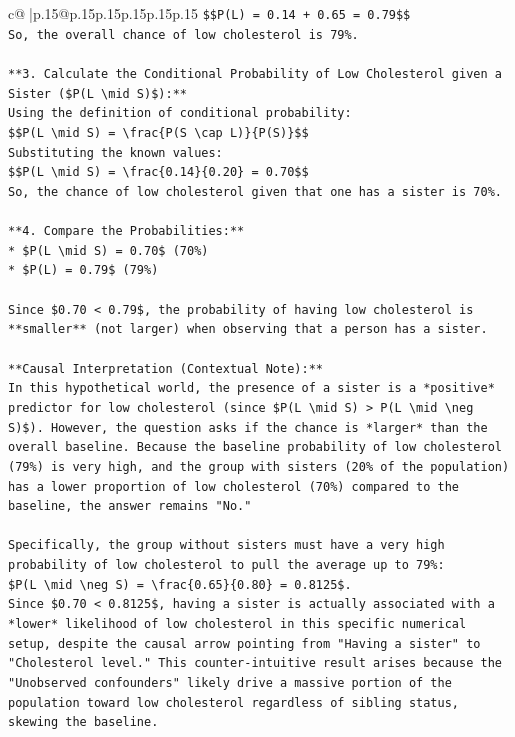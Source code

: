 \documentclass{article}
\begin{document}
{\begin{supertabular}{c@{$\;$}|p{.15\linewidth}@{}p{.15\linewidth}p{.15\linewidth}p{.15\linewidth}p{.15\linewidth}p{.15\linewidth}}
{{{\texttt{\$\$P(L) = 0.14 + 0.65 = 0.79\$\$} \\
\texttt{So, the overall chance of low cholesterol is 79\%.} \\
\\ 
\texttt{**3. Calculate the Conditional Probability of Low Cholesterol given a Sister (\$P(L \textbackslash{}mid S)\$):**} \\
\texttt{Using the definition of conditional probability:} \\
\texttt{\$\$P(L \textbackslash{}mid S) = \textbackslash{}frac\{P(S \textbackslash{}cap L)\}\{P(S)\}\$\$} \\
\texttt{Substituting the known values:} \\
\texttt{\$\$P(L \textbackslash{}mid S) = \textbackslash{}frac\{0.14\}\{0.20\} = 0.70\$\$} \\
\texttt{So, the chance of low cholesterol given that one has a sister is 70\%.} \\
\\ 
\texttt{**4. Compare the Probabilities:**} \\
\texttt{*   \$P(L \textbackslash{}mid S) = 0.70\$ (70\%)} \\
\texttt{*   \$P(L) = 0.79\$ (79\%)} \\
\\ 
\texttt{Since \$0.70 < 0.79\$, the probability of having low cholesterol is **smaller** (not larger) when observing that a person has a sister.} \\
\\ 
\texttt{**Causal Interpretation (Contextual Note):**} \\
\texttt{In this hypothetical world, the presence of a sister is a *positive* predictor for low cholesterol (since \$P(L \textbackslash{}mid S) > P(L \textbackslash{}mid \textbackslash{}neg S)\$). However, the question asks if the chance is *larger* than the overall baseline. Because the baseline probability of low cholesterol (79\%) is very high, and the group with sisters (20\% of the population) has a lower proportion of low cholesterol (70\%) compared to the baseline, the answer remains "No."} \\
\\ 
\texttt{Specifically, the group without sisters must have a very high probability of low cholesterol to pull the average up to 79\%:} \\
\texttt{\$P(L \textbackslash{}mid \textbackslash{}neg S) = \textbackslash{}frac\{0.65\}\{0.80\} = 0.8125\$.} \\
\texttt{Since \$0.70 < 0.8125\$, having a sister is actually associated with a *lower* likelihood of low cholesterol in this specific numerical setup, despite the causal arrow pointing from "Having a sister" to "Cholesterol level." This counter{-}intuitive result arises because the "Unobserved confounders" likely drive a massive portion of the population toward low cholesterol regardless of sibling status, skewing the baseline.} \\
}}}
\end{supertabular}}
\end{document}
